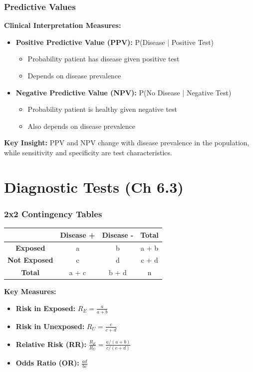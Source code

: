 \documentclass{beamer}
\begin{document}
\begin{frame}
\frametitle{Predictive Values}
\textbf{Clinical Interpretation Measures:}
\begin{itemize}
\item \textbf{Positive Predictive Value (PPV):} P(Disease | Positive Test)
  \begin{itemize}
  \item Probability patient has disease given positive test
  \item Depends on disease prevalence
  \end{itemize}
\item \textbf{Negative Predictive Value (NPV):} P(No Disease | Negative Test)
  \begin{itemize}
  \item Probability patient is healthy given negative test
  \item Also depends on disease prevalence
  \end{itemize}
\end{itemize}

\vspace{0.5cm}
\textbf{Key Insight:} PPV and NPV change with disease prevalence in the population, while sensitivity and specificity are test characteristics.
\end{frame}

\section{Diagnostic Tests (Ch 6.3)}

\begin{frame}
\frametitle{2x2 Contingency Tables}
\begin{center}
\begin{tabular}{|c|c|c|c|}
\hline
& \textbf{Disease +} & \textbf{Disease -} & \textbf{Total} \\
\hline
\textbf{Exposed} & a & b & a + b \\
\hline
\textbf{Not Exposed} & c & d & c + d \\
\hline
\textbf{Total} & a + c & b + d & n \\
\hline
\end{tabular}
\end{center}

\vspace{0.5cm}
\textbf{Key Measures:}
\begin{itemize}
\item \textbf{Risk in Exposed:} $R_E = \frac{a}{a+b}$
\item \textbf{Risk in Unexposed:} $R_U = \frac{c}{c+d}$
\item \textbf{Relative Risk (RR):} $\frac{R_E}{R_U} = \frac{a/(a+b)}{c/(c+d)}$
\item \textbf{Odds Ratio (OR):} $\frac{ad}{bc}$
\end{itemize}
\end{frame}
\end{document}
